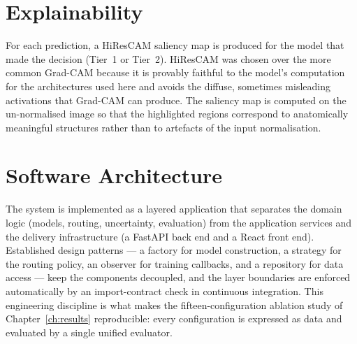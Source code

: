 

\section{Explainability}
\label{sec:explain}
For each prediction, a HiResCAM \cite{draelos2020hirescam} saliency map is produced for the model that made the decision (Tier~1 or Tier~2). HiResCAM was chosen over the more common Grad-CAM \cite{selvaraju2017gradcam} because it is provably faithful to the model's computation for the architectures used here and avoids the diffuse, sometimes misleading activations that Grad-CAM can produce. The saliency map is computed on the un-normalised image so that the highlighted regions correspond to anatomically meaningful structures rather than to artefacts of the input normalisation.

\section{Software Architecture}
\label{sec:software}
The system is implemented as a layered application that separates the domain logic (models, routing, uncertainty, evaluation) from the application services and the delivery infrastructure (a FastAPI back end and a React front end). Established design patterns --- a factory for model construction, a strategy for the routing policy, an observer for training callbacks, and a repository for data access --- keep the components decoupled, and the layer boundaries are enforced automatically by an import-contract check in continuous integration. This engineering discipline is what makes the fifteen-configuration ablation study of Chapter~\ref{ch:results} reproducible: every configuration is expressed as data and evaluated by a single unified evaluator.
